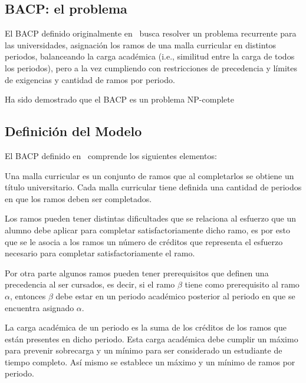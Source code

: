 \documentclass[letterpaper,10pt]{article}
\begin{document}

\subsection{BACP: el problema}
El BACP definido originalmente en~\cite{csplibprob030} busca resolver un problema recurrente para las universidades, asignación los ramos de una malla curricular en distintos periodos, balanceando la carga académica (i.e., similitud entre la carga de todos los periodos), pero a la vez cumpliendo con restricciones de precedencia y límites de exigencias y cantidad de ramos por periodo.

Ha sido demostrado que el BACP es un problema NP-complete~\cite{balac,Monette07acp}

\subsection{Definición del Modelo}
El BACP definido en~\cite{DBLP:journals/corr/cs-PL-0110007} comprende los siguientes elementos:

Una malla curricular es un conjunto de ramos que al completarlos se obtiene un título universitario. Cada malla curricular tiene definida una cantidad de periodos en que los ramos deben ser completados.

Los ramos pueden tener distintas dificultades que se relaciona al esfuerzo que un alumno debe aplicar para completar satisfactoriamente dicho ramo, es por esto que se le asocia a los ramos un n\'umero de créditos que representa el esfuerzo necesario para completar satisfactoriamente el ramo.

Por otra parte algunos ramos pueden tener prerequisitos que definen una precedencia al ser cursados, es decir, si el ramo $\beta$ tiene como prerequisito al ramo $\alpha$, entonces $\beta$ debe estar en un periodo académico posterior al periodo en que se encuentra asignado $\alpha$.

La carga académica de un periodo es la suma de los créditos de los ramos que están presentes en dicho periodo. Esta carga académica debe cumplir un máximo para prevenir sobrecarga y un mínimo para ser considerado un estudiante de tiempo completo. Así mismo se establece un máximo y un mínimo de ramos por periodo.
\end{document}
